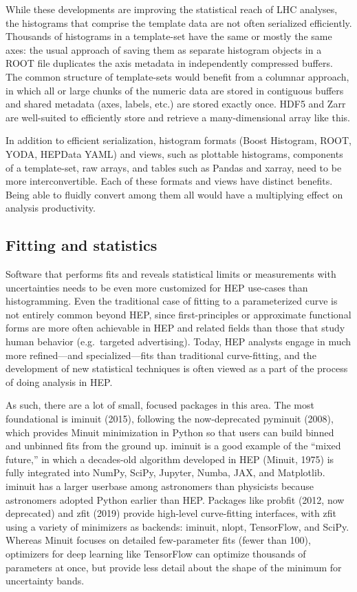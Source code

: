 \documentclass{article}
\begin{document}
While these developments are improving the statistical reach of LHC analyses, the histograms that comprise the template data are not often serialized efficiently. Thousands of histograms in a template-set have the same or mostly the same axes: the usual approach of saving them as separate histogram objects in a ROOT file duplicates the axis metadata in independently compressed buffers. The common structure of template-sets would benefit from a columnar approach, in which all or large chunks of the numeric data are stored in contiguous buffers and shared metadata (axes, labels, etc.) are stored exactly once. HDF5 and Zarr are well-suited to efficiently store and retrieve a many-dimensional array like this.

In addition to efficient serialization, histogram formats (Boost Histogram, ROOT, YODA, HEPData YAML) and views, such as plottable histograms, components of a template-set, raw arrays, and tables such as Pandas and xarray, need to be more interconvertible. Each of these formats and views have distinct benefits. Being able to fluidly convert among them all would have a multiplying effect on analysis productivity.

\subsection{Fitting and statistics}

Software that performs fits and reveals statistical limits or measurements with uncertainties needs to be even more customized for HEP use-cases than histogramming. Even the traditional case of fitting to a parameterized curve is not entirely common beyond HEP, since first-principles or approximate functional forms are more often achievable in HEP and related fields than those that study human behavior (e.g.\ targeted advertising). Today, HEP analysts engage in much more refined---and specialized---fits than traditional curve-fitting, and the development of new statistical techniques is often viewed as a part of the process of doing analysis in HEP.

As such, there are a lot of small, focused packages in this area. The most foundational is iminuit (2015), following the now-deprecated pyminuit (2008), which provides Minuit minimization in Python so that users can build binned and unbinned fits from the ground up. iminuit is a good example of the ``mixed future,'' in which a decades-old algorithm developed in HEP (Minuit, 1975) is fully integrated into NumPy, SciPy, Jupyter, Numba, JAX, and Matplotlib. iminuit has a larger userbase among astronomers than physicists because astronomers adopted Python earlier than HEP. Packages like probfit (2012, now deprecated) and zfit (2019) provide high-level curve-fitting interfaces, with zfit using a variety of minimizers as backends: iminuit, nlopt, TensorFlow, and SciPy. Whereas Minuit focuses on detailed few-parameter fits (fewer than 100), optimizers for deep learning like TensorFlow can optimize thousands of parameters at once, but provide less detail about the shape of the minimum for uncertainty bands.
\end{document}
